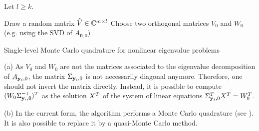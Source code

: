 Let $l \geq k$.
\begin{algorithm}
    \DontPrintSemicolon


    \BlankLine
    Draw a random matrix $\widehat{V} \in \mathbb{C}^{m\times l}$\;
    Choose two orthogonal matrices $V_0$ and $W_0$ (e.g. using the SVD of $A_{\mathbf{0},0})$\;
    \caption{Single-level Monte Carlo quadrature for nonlinear eigenvalue problems}\label{alg:single-level}
\end{algorithm}
\begin{rem}
    (a) As $V_0$ and $W_0$ are not the matrices associated to the eigenvalue decomposition of $A_{\mathbf{y}_i, 0}$, the matrix $\Sigma_{\mathbf{y}_i, 0}$ is not necessarily diagonal anymore.
    Therefore, one should not invert the matrix directly.
    Instead, it is possible to compute $(W_0 \Sigma_{\mathbf{y}_i,0}^{-1})^T$ as the solution $X^T$ of the system of linear equations $\Sigma_{\mathbf{y}_i,0}^T X^T = W_0^T$.

    (b) In the current form, the algorithm performs a Monte Carlo quadrature (see ).
    It is also possible to replace it by a quasi-Monte Carlo method. %
\end{rem}